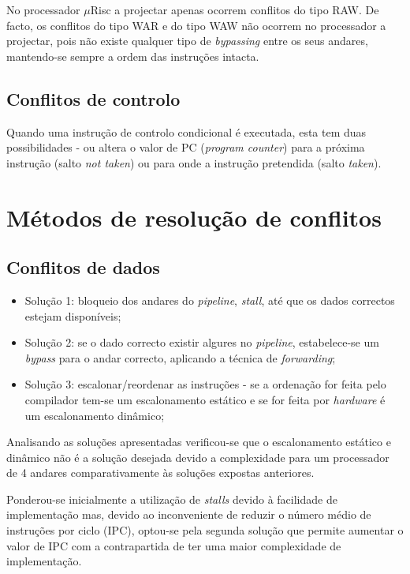 \documentclass[11pt]{article}
\numberwithin{equation}{section}
\begin{document}
No processador $\mu$Risc a projectar apenas ocorrem conflitos do tipo RAW. De facto, os conflitos do tipo WAR e do tipo WAW não ocorrem no processador a projectar, pois não existe qualquer tipo de \textit{bypassing} entre os seus andares, mantendo-se sempre a ordem das instruções intacta.

\subsection{Conflitos de controlo}

Quando uma instrução de controlo condicional é executada, esta tem duas possibilidades - ou altera o valor de PC (\textit{program counter}) para a próxima instrução (salto \textit{not taken}) ou para onde a instrução pretendida (salto \textit{taken}). 

\section{Métodos de resolução de conflitos}

\subsection{Conflitos de dados}

\begin{itemize}
	\item Solução 1: bloqueio dos andares do \textit{pipeline}, \textit{stall}, até que os dados correctos estejam disponíveis;
	\vspace{-2.5mm}
	\item Solução 2: se o dado correcto existir algures no \textit{pipeline}, estabelece-se um \textit{bypass} para o andar correcto, aplicando a técnica de \textit{forwarding};
	\vspace{-2.5mm}
	\item Solução 3: escalonar/reordenar as instruções - se a ordenação for feita pelo compilador tem-se um escalonamento estático e se for feita por \textit{hardware} é um escalonamento dinâmico;
\end{itemize}

\vspace{-1.5mm}

Analisando as soluções apresentadas verificou-se que o escalonamento estático e dinâmico não é a solução desejada devido a complexidade para um processador de 4 andares comparativamente às soluções expostas anteriores. 

Ponderou-se inicialmente a utilização de \textit{stalls} devido à facilidade de implementação mas, devido ao inconveniente de reduzir o número médio de instruções por ciclo (IPC), optou-se pela segunda solução que permite aumentar o valor de IPC com a contrapartida de ter uma maior complexidade de implementação.
\end{document}
